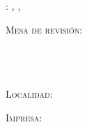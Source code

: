 \thispagestyle{empty}

\hfill

\vfill

\noindent\myName: \textit{\myTitle,} \myDegree, 
\textcopyright \myTime

\bigskip

\noindent\textsc{Mesa de revisión}: \\
\myProf \\
\myOtherProf \\ 
\mySupervisor \\
\myOtherSupervisor

\medskip 

\noindent\textsc{Localidad}: \\
\myLocation

\medskip 

\noindent\textsc{Impresa}: \\
\myTime
